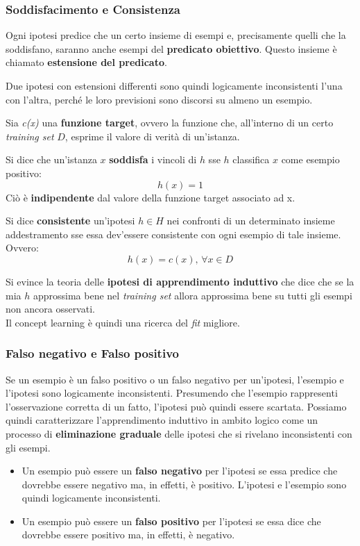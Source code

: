 \subsubsection{Soddisfacimento e Consistenza}
Ogni ipotesi predice che un certo insieme di esempi e, precisamente quelli che la soddisfano, saranno anche esempi del \textbf{predicato obiettivo}. Questo insieme è chiamato \textbf{estensione del predicato}. \begin{definizione}
  Due ipotesi con estensioni differenti sono quindi logicamente inconsistenti l'una con l'altra, perché le loro previsioni sono discorsi su almeno un esempio.
\end{definizione}
Sia \textit{c(x)} una \textbf{funzione target}, ovvero la funzione che, all'interno di un certo \textit{training set} $D$, esprime il valore di verità di un'istanza.
\begin{definizione}
Si dice che un'istanza $x$ \textbf{soddisfa} i vincoli di $h$ sse $h$ classifica $x$ come
esempio positivo:
\[h(x)=1\]  
Ciò è \textbf{indipendente} dal valore della funzione target associato ad x.
\end{definizione}

\begin{definizione}
 Si dice \textbf{consistente} un'ipotesi $h\in H$ nei confronti di un determinato insieme addestramento sse essa dev'essere consistente con ogni esempio di tale insieme. Ovvero: 
\[h(x)=c(x),\,\forall x\in D\]  
\end{definizione}

Si evince la teoria delle \textbf{ipotesi di apprendimento induttivo} che dice che se la mia $h$ approssima bene nel \textit{training set} allora approssima bene su tutti gli esempi non ancora osservati.\\
Il concept learning è quindi una ricerca del \textit{fit} migliore.
\subsubsection{Falso negativo e Falso positivo}
Se un esempio è un falso positivo o un falso negativo per un'ipotesi, l'esempio e l'ipotesi sono logicamente inconsistenti. Presumendo che l'esempio rappresenti l'osservazione corretta di un fatto, l'ipotesi può quindi essere scartata. Possiamo quindi caratterizzare l'apprendimento induttivo in ambito logico come un processo di \textbf{eliminazione graduale} delle ipotesi che si rivelano inconsistenti con gli esempi.
\begin{itemize}
    \item Un esempio può essere un \textbf{falso negativo} per l'ipotesi se essa predice che dovrebbe essere negativo ma, in effetti, è positivo. L'ipotesi e l'esempio sono quindi logicamente inconsistenti.
    \item Un esempio può essere un \textbf{falso positivo} per l'ipotesi se essa dice che dovrebbe essere positivo ma, in effetti, è negativo.
\end{itemize}
